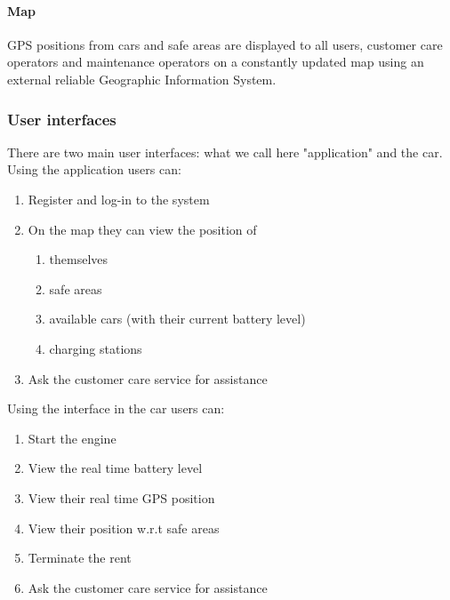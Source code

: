 	\paragraph{Map} GPS positions from cars and safe areas are displayed to all users, customer care operators and maintenance operators on a constantly updated map using an external reliable Geographic Information System.

	
	
	
\subsubsection{User interfaces}
	There are two main user interfaces: what we call here "application" and the car.\\
	Using the application users can:
	\begin{enumerate}
		\item Register and log-in to the system
		\item On the map they can view the position of
			\begin{enumerate}[label=\alph*)]
				\item themselves
				\item safe areas
				\item available cars (with their current battery level)
				\item charging stations
			\end{enumerate}
		\item Ask the customer care service for assistance 
	\end{enumerate}
	Using the interface in the car users can:
	\begin{enumerate}
		\item Start the engine
		\item View the real time battery level
		\item View their real time GPS position
		\item View their position w.r.t safe areas
		\item Terminate the rent
		\item Ask the customer care service for assistance
	\end{enumerate}			


